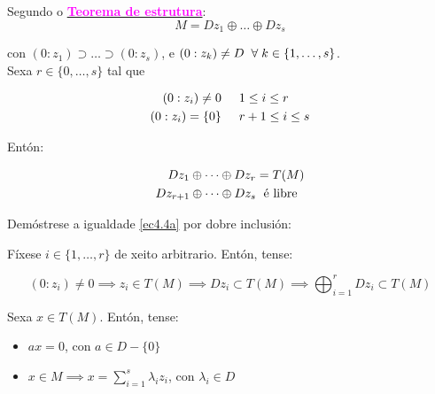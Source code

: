 \documentclass[twoside]{report}
\newcommand{\magbf}[1]{\textcolor{magenta}{\textbf{#1}}} %
\theoremstyle{mystyle}
\begin{document}
\vspace{2mm}

\noindent Segundo o \hyperref[th4.2]{\magbf{Teorema de estrutura}}:\\

$$M = Dz_{1} \oplus \dots \oplus Dz_{s}$$

\vspace{3mm}

\noindent con $(0 : z_{1}) \supset \dots \supset (0 : z_{s})$, e $(0 : z_{k}) \neq D \hspace{2mm} \forall \hspace{1mm} k \in \{1, \dots, s\}$.\\

\noindent Sexa $r \in \{0, \dots, s\}$ tal que

\begin{align*}
    (0 : z_{i}) \neq 0 & \hspace{5mm} 1 \leq i \leq r \\
    (0 : z_{i}) = \{0\} & \hspace{5mm} r + 1 \leq i \leq s
\end{align*}

\vspace{3mm}

\noindent Entón:

\begin{subequations}
\begin{align}
    Dz_{1} \oplus \dots \oplus Dz_{r} & = T(M) \label{ec4.4a}\\
    Dz_{r+1} \oplus \dots \oplus Dz_{s} & \hspace{1mm} \text{ é libre} \label{ec4.4b}
\end{align}
\end{subequations}

\vspace{4mm}

\noindent Demóstrese a igualdade \eqref{ec4.4a} por dobre inclusión:

\pagebreak

\noindent {} Fíxese $i \in \{1, \dots, r\}$ de xeito arbitrario. Entón, tense:

$$(0 : z_{i}) \neq 0 \implies z_{i} \in T(M) \implies Dz_{i} \subset T(M) \implies \displaystyle \bigoplus_{i = 1}^{r}Dz_{i} \subset T(M)$$

\vspace{3mm}

\noindent {} Sexa $x \in T(M)$. Entón, tense:
\begin{itemize}
    \item $ax = 0$, con $a \in D-\{0\}$
    \item $x \in M \implies x = \displaystyle \sum_{i = 1}^{s}\lambda_{i}z_{i}$, con $\lambda_{i} \in D$
\end{itemize}
\end{document}
